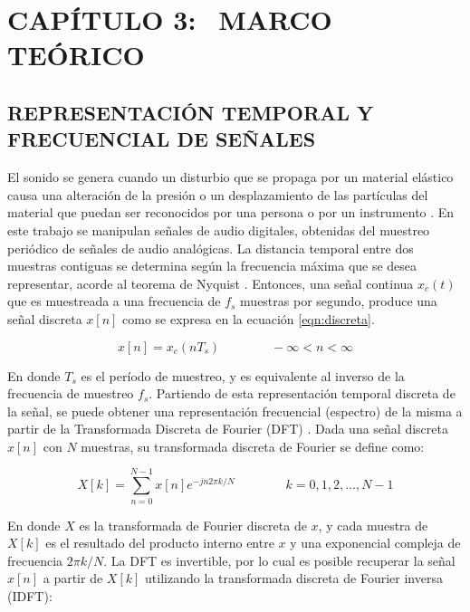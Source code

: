 \section[Marco Teórico]{CAPÍTULO 3:$\ \ \ \ $MARCO TEÓRICO} 

\subsection[Representación temporal y frecuencial de señales]{REPRESENTACIÓN TEMPORAL Y FRECUENCIAL DE SEÑALES}

El sonido se genera cuando un disturbio que se propaga por un
material elástico causa una alteración de la presión o un desplazamiento
de las partículas del material que puedan ser reconocidos por una persona o por un instrumento \cite{Beranek}. 
En este trabajo se manipulan señales de audio digitales, obtenidas del muestreo periódico de señales de audio analógicas. La distancia temporal entre dos muestras contiguas se determina según la frecuencia máxima que se desea representar, acorde al teorema de Nyquist \cite{openheim}. Entonces, una señal continua $x_{c}(t)$ que es muestreada a una frecuencia de $f_{s}$ muestras por segundo, produce una señal discreta $x[n]$ como se expresa en la ecuación \ref{eqn:discreta}.

\begin{equation}
\label{eqn:discreta}
	x[n] = x_{c}(nT_{s}) \qquad \qquad -\infty < n < \infty
\end{equation} 

En donde $T_{s}$ es el período de muestreo, y es equivalente al inverso de la frecuencia de muestreo $f_{s}$.
Partiendo de esta representación temporal discreta de la señal, se puede obtener una representación frecuencial (espectro) de la misma a partir de la Transformada Discreta de Fourier (DFT) \cite{openheim}. 
Dada una señal discreta $x[n]$ con $N$ muestras, su transformada discreta de Fourier se define como:

\begin{equation}
\label{eqn:DFT}
	X[k] = \sum_{n=0}^{N-1} x[n]e^{-jn2 \pi k/N} \qquad \qquad  k = 0, 1, 2,..., N-1
\end{equation} 

En donde $X$ es la transformada de Fourier discreta de $x$, y cada muestra de $X[k]$ es el resultado del producto interno entre $x$ y una exponencial compleja de frecuencia $2 \pi k/N$. La DFT es invertible, por lo cual es posible recuperar la señal $x[n]$ a partir de $X[k]$ utilizando la transformada discreta de Fourier inversa (IDFT):

